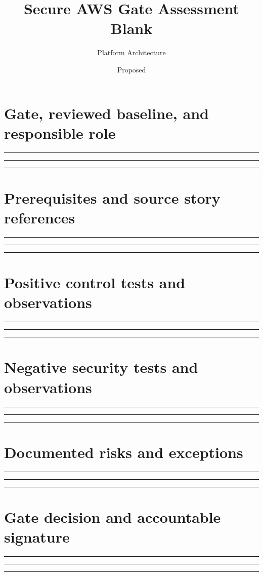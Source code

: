 \documentclass[11pt,letterpaper]{article}
\title{Secure AWS Gate Assessment Blank}
\author{Platform Architecture}
\date{Proposed}
\newcommand{\WritingLines}{\par\vspace{5mm}\noindent\rule{\linewidth}{0.3pt}\par\vspace{5mm}\noindent\rule{\linewidth}{0.3pt}\par\vspace{5mm}\noindent\rule{\linewidth}{0.3pt}\par}
\begin{document}
\maketitle
\section{Gate, reviewed baseline, and responsible role}
\WritingLines
\section{Prerequisites and source story references}
\WritingLines
\section{Positive control tests and observations}
\WritingLines
\section{Negative security tests and observations}
\WritingLines
\section{Documented risks and exceptions}
\WritingLines
\section{Gate decision and accountable signature}
\WritingLines
\end{document}
